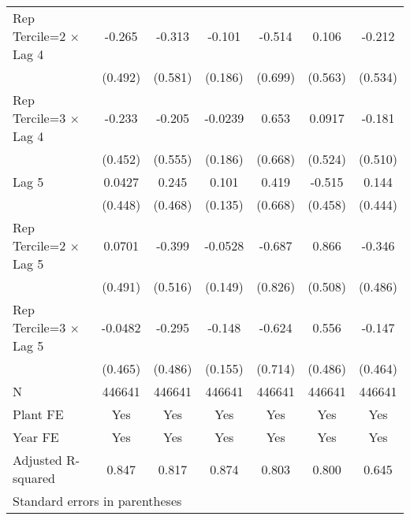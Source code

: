 \begin{table}[htbp]
\begin{tabular}{l*{6}{c}}
\addlinespace
Rep Tercile=2 $\times$ Lag 4&   -0.265         &   -0.313         &   -0.101         &   -0.514         &    0.106         &   -0.212         \\
                &  (0.492)         &  (0.581)         &  (0.186)         &  (0.699)         &  (0.563)         &  (0.534)         \\
\addlinespace
Rep Tercile=3 $\times$ Lag 4&   -0.233         &   -0.205         &  -0.0239         &    0.653         &   0.0917         &   -0.181         \\
                &  (0.452)         &  (0.555)         &  (0.186)         &  (0.668)         &  (0.524)         &  (0.510)         \\
\addlinespace
Lag 5           &   0.0427         &    0.245         &    0.101         &    0.419         &   -0.515         &    0.144         \\
                &  (0.448)         &  (0.468)         &  (0.135)         &  (0.668)         &  (0.458)         &  (0.444)         \\
\addlinespace
Rep Tercile=2 $\times$ Lag 5&   0.0701         &   -0.399         &  -0.0528         &   -0.687         &    0.866         &   -0.346         \\
                &  (0.491)         &  (0.516)         &  (0.149)         &  (0.826)         &  (0.508)         &  (0.486)         \\
\addlinespace
Rep Tercile=3 $\times$ Lag 5&  -0.0482         &   -0.295         &   -0.148         &   -0.624         &    0.556         &   -0.147         \\
                &  (0.465)         &  (0.486)         &  (0.155)         &  (0.714)         &  (0.486)         &  (0.464)         \\
\midrule
N               &   446641         &   446641         &   446641         &   446641         &   446641         &   446641         \\
Plant FE        &      Yes         &      Yes         &      Yes         &      Yes         &      Yes         &      Yes         \\
Year FE         &      Yes         &      Yes         &      Yes         &      Yes         &      Yes         &      Yes         \\
Adjusted R-squared&    0.847         &    0.817         &    0.874         &    0.803         &    0.800         &    0.645         \\
\bottomrule
\multicolumn{7}{l}{\footnotesize Standard errors in parentheses}\\

\end{tabular}
\end{table}
